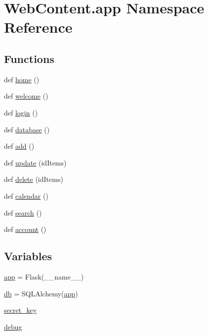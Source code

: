 \hypertarget{namespace_web_content_1_1app}{}\section{Web\+Content.\+app Namespace Reference}
\label{namespace_web_content_1_1app}
\subsection*{Functions}
\begin{DoxyCompactItemize}
\item 
def \hyperlink{namespace_web_content_1_1app_ab0090e2c92ec892cf11fed49d580737a}{home} ()
\item 
def \hyperlink{namespace_web_content_1_1app_ac220a4f6d552ae239a9fe5a933eb4c0d}{welcome} ()
\item 
def \hyperlink{namespace_web_content_1_1app_a1e55cf68c2c2c883c82749a8725e068c}{login} ()
\item 
def \hyperlink{namespace_web_content_1_1app_aeb0d3df489a674be05033bd0ba98e7a6}{database} ()
\item 
def \hyperlink{namespace_web_content_1_1app_a01e890f5f74756a5e0db012e87a3bb32}{add} ()
\item 
def \hyperlink{namespace_web_content_1_1app_a2f6071690c83608f94abb72589ab7527}{update} (id\+Items)
\item 
def \hyperlink{namespace_web_content_1_1app_a280b9c530dfd4125df19a186218bb132}{delete} (id\+Items)
\item 
def \hyperlink{namespace_web_content_1_1app_a368b9d1da5b4c987484797ecce9aabc9}{calendar} ()
\item 
def \hyperlink{namespace_web_content_1_1app_a6d7ee2ff030bada6042b07189d92a01c}{search} ()
\item 
def \hyperlink{namespace_web_content_1_1app_afe68584aa29f9b47108d88d14650c05f}{account} ()
\end{DoxyCompactItemize}
\subsection*{Variables}
\begin{DoxyCompactItemize}
\item 
\hyperlink{namespace_web_content_1_1app_a52716e6e08bae668f90c903a1f4e2f10}{app} = Flask(\+\_\+\+\_\+name\+\_\+\+\_\+)
\item 
\hyperlink{namespace_web_content_1_1app_a317646b91bdcf24c176d3bfc065083f3}{db} = S\+Q\+L\+Alchemy(\hyperlink{namespace_web_content_1_1app_a52716e6e08bae668f90c903a1f4e2f10}{app})
\item 
\hyperlink{namespace_web_content_1_1app_a6092358451315e755637b56d42326052}{secret\+\_\+key}
\item 
\hyperlink{namespace_web_content_1_1app_ac91170bea34c6458f4262824618a18a2}{debug}
\end{DoxyCompactItemize}


